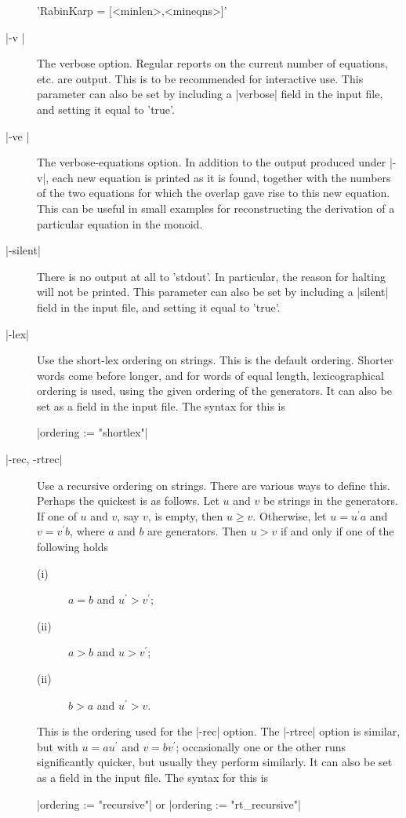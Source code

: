 \begin{description}
'RabinKarp \:= [<minlen>,<mineqns>]'
\item[|-v |]
The verbose option. Regular reports on the current number of equations, etc. are
output. This is to be recommended for interactive use.
This parameter can also be set by including a |verbose| field in the input
file, and setting it equal to 'true'.
\item[|-ve |]
The verbose-equations option. In addition to the output produced under
|-v|, each new equation is printed as it is found, together with the
numbers of the two equations for which the overlap gave rise to this
new equation. This can be useful in small examples for reconstructing
the derivation of a particular equation in the monoid.
\item[|-silent|]
There is no output at all to 'stdout'. In particular, the reason for
halting will not be printed.
This parameter can also be set by including a |silent| field in the input
file, and setting it equal to 'true'.
\item[|-lex|]
Use the short-lex ordering on strings. This is the default ordering.
Shorter words come before longer, and for words of equal length,
lexicographical ordering is used, using the given ordering of the generators.
It can also be set as a field in the input file. The syntax for this is

|ordering := "shortlex"|
\item[|-rec, -rtrec|]
Use a recursive ordering on strings. 
There are various ways to define this. Perhaps the quickest is as
follows. Let $u$ and $v$ be strings in the generators.
If one of $u$ and $v$, say $v$,  is empty, then $u \ge v$.
Otherwise, let $u=u^\prime a$ and $v=v^\prime b$,
where $a$ and $b$ are generators.
Then $u > v$ if and only if one of the following holds\:
\begin {description}
\item[(i)] $a = b$ and $u^\prime > v^\prime$;
\item[(ii)] $a > b$ and $u > v^\prime$;
\item[(ii)] $b > a$ and $u^\prime > v$.
\end {description}
This is the ordering used for the |-rec| option. The |-rtrec| option is
similar, but with $u=au^\prime$ and $v=bv^\prime$;
occasionally one or the other runs
significantly quicker, but usually they perform similarly.
It can also be set as a field in the input file. The syntax for this is

|ordering := "recursive"| \hspace{1cm} or  \hspace{1cm}
|ordering := "rt_recursive"|


\end{description}
